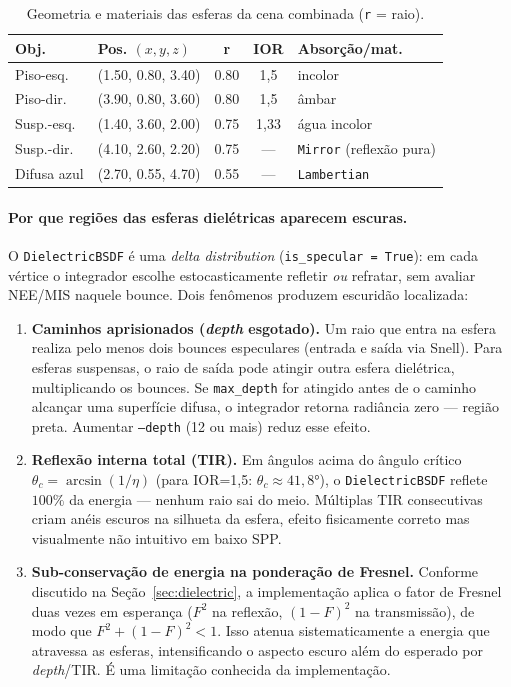 \documentclass[portuguese]{sbcreviews-2025}%
\begin{document}
\begin{table}[!ht]
\caption{Geometria e materiais das esferas da cena combinada (\texttt{r} = raio).}
\label{tab:combined-obj}
\centering\small
\begin{tabular}{@{}llccl@{}}
\hline
\textbf{Obj.} & \textbf{Pos. $(x,y,z)$} & \textbf{r} & \textbf{IOR} & \textbf{Absorção/mat.} \\
\hline
Piso-esq. & (1.50, 0.80, 3.40) & 0.80 & 1{,}5 & incolor \\
Piso-dir. & (3.90, 0.80, 3.60) & 0.80 & 1{,}5 & âmbar \\
Susp.-esq. & (1.40, 3.60, 2.00) & 0.75 & 1{,}33 & água incolor \\
Susp.-dir. & (4.10, 2.60, 2.20) & 0.75 & — & \texttt{Mirror} (reflexão pura) \\
Difusa azul & (2.70, 0.55, 4.70) & 0.55 & — & \texttt{Lambertian} \\
\hline
\end{tabular}
\end{table}

\paragraph{Por que regiões das esferas dielétricas aparecem escuras.}
O \texttt{DielectricBSDF} é uma \emph{delta distribution} (\texttt{is\_specular = True}):
em cada vértice o integrador escolhe estocasticamente refletir \emph{ou} refratar, sem
avaliar NEE/MIS naquele bounce. Dois fenômenos produzem escuridão localizada:

\begin{enumerate}\small\setlength{\itemsep}{1pt}
\item \textbf{Caminhos aprisionados (\emph{depth} esgotado).} Um raio que entra na esfera
  realiza pelo menos dois bounces especulares (entrada e saída via Snell). Para esferas
  suspensas, o raio de saída pode atingir outra esfera dielétrica, multiplicando os bounces.
  Se \texttt{max\_depth} for atingido antes de o caminho alcançar uma superfície difusa,
  o integrador retorna radiância zero --- região preta. Aumentar \texttt{--depth} (12 ou mais)
  reduz esse efeito.

\item \textbf{Reflexão interna total (TIR).} Em ângulos acima do ângulo crítico
  $\theta_c = \arcsin(1/\eta)$ (para IOR=1{,}5: $\theta_c \approx 41{,}8°$), o
  \texttt{DielectricBSDF} reflete $100\%$ da energia --- nenhum raio sai do meio. Múltiplas
  TIR consecutivas criam anéis escuros na silhueta da esfera, efeito fisicamente correto
  mas visualmente não intuitivo em baixo SPP.

\item \textbf{Sub-conservação de energia na ponderação de Fresnel.} Conforme discutido na
  Seção~\ref{sec:dielectric}, a implementação aplica o fator de Fresnel duas vezes em esperança
  ($F^2$ na reflexão, $(1-F)^2$ na transmissão), de modo que $F^2+(1-F)^2<1$. Isso atenua
  sistematicamente a energia que atravessa as esferas, intensificando o aspecto escuro além do
  esperado por \emph{depth}/TIR. É uma limitação conhecida da implementação.
\end{enumerate}
\end{document}
